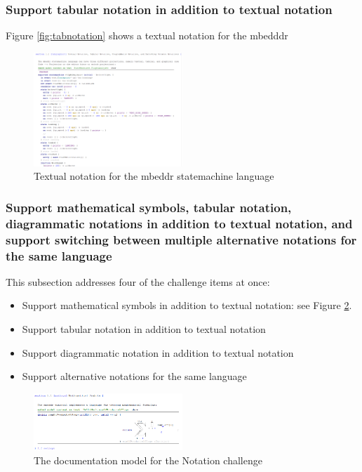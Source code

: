 \documentclass[preprint,numbers,10pt]{sigplanconf}
\begin{document}
\subsubsection{Support tabular notation in addition to textual notation}
Figure \ref{fig:tabnotation} shows a textual notation for the mbedddr
\begin{figure}[p]
	\centering
	\includegraphics[width=0.50\textwidth]{screens/TextualNotationStatemachine.png}
	\caption{Textual notation for the mbeddr statemachine language}
	\label{fig:txtnotationsm}
\end{figure}

\subsubsection{Support mathematical symbols, tabular notation, diagrammatic notations in addition to textual notation, and support switching between multiple alternative notations for the same language}
This subsection addresses four of the challenge items at once:
\begin{itemize}
	\item Support mathematical symbols in addition to textual notation: see Figure \ref{fig:mathnotation}.
	\item Support tabular notation in addition to textual notation
	\item Support diagrammatic notation in addition to textual notation
	\item Support alternative notations for the same language
\end{itemize}

\begin{figure}[p]
	\centering
	\includegraphics[width=0.50\textwidth]{screens/MathematicalNotation.png}
	\caption{The documentation model for the Notation challenge}
	\label{fig:mathnotation}
\end{figure}
\end{document}
